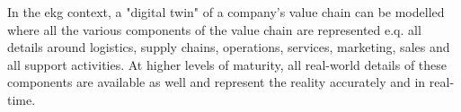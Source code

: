 %
%
In the \gls{ekg} context, a "digital twin" of a company's value chain can be modelled
where all the various components of the value chain are represented e.q. all details around logistics,
supply chains, operations, services, marketing, sales and all support activities.
At higher levels of maturity, all real-world details of these components are available as well and represent
the reality accurately and in real-time.
